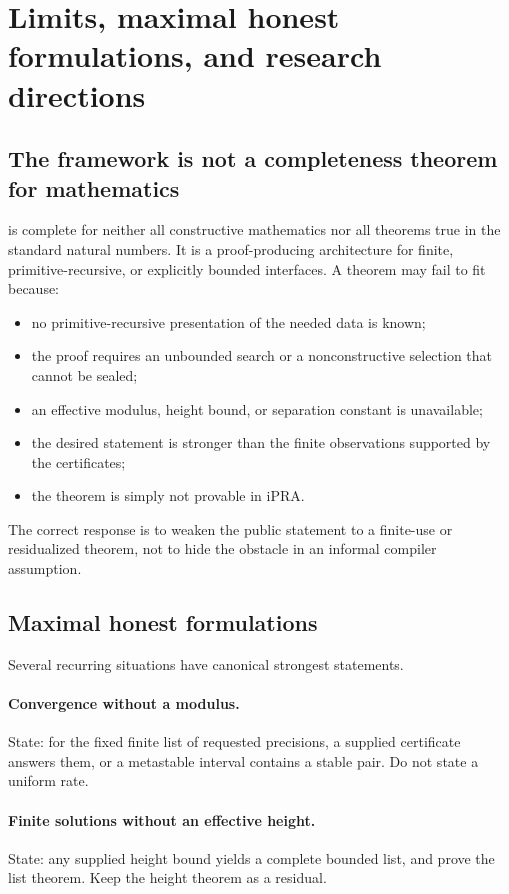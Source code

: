 \section{Limits, maximal honest formulations, and research directions}\label{sec:limits}

\subsection{The framework is not a completeness theorem for mathematics}

\TAPIR{} is complete for neither all constructive mathematics nor all theorems true in the standard
natural numbers.  It is a proof-producing architecture for finite, primitive-recursive, or explicitly
bounded interfaces.  A theorem may fail to fit because:

\begin{itemize}
\item no primitive-recursive presentation of the needed data is known;
\item the proof requires an unbounded search or a nonconstructive selection that cannot be sealed;
\item an effective modulus, height bound, or separation constant is unavailable;
\item the desired statement is stronger than the finite observations supported by the certificates;
\item the theorem is simply not provable in iPRA.
\end{itemize}

The correct response is to weaken the public statement to a finite-use or residualized theorem, not
to hide the obstacle in an informal compiler assumption.

\subsection{Maximal honest formulations}

Several recurring situations have canonical strongest statements.

\paragraph{Convergence without a modulus.}
State: for the fixed finite list of requested precisions, a supplied certificate answers them, or a
metastable interval contains a stable pair.  Do not state a uniform rate.

\paragraph{Finite solutions without an effective height.}
State: any supplied height bound yields a complete bounded list, and prove the list theorem.  Keep the
height theorem as a residual.

